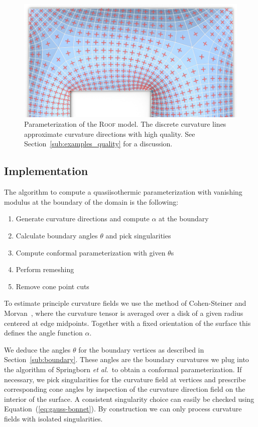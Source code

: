 \documentclass[twoside]{article}
\begin{document}
\begin{figure}[t]
\centering
\includegraphics[width=\linewidth]{../images/dach_example01_directions.png}
\caption{Parameterization of the \textsc{Roof} model. The discrete 
curvature lines approximate curvature directions with high quality. See 
Section~\ref{sub:examples_quality} for a discussion.}
\label{fig:dach01_directions}
\end{figure}

\subsection{Implementation}
\label{sub:parameterization}

The algorithm to compute a quasiisothermic parameterization with vanishing modulus at the 
boundary of the domain is the following:
\begin{enumerate}
\item Generate curvature directions and compute $\alpha$ at the boundary
\item Calculate boundary angles $\theta$ and pick singularities
\item Compute conformal parameterization with given $\theta$s
\item Perform remeshing
\item Remove cone point cuts 
\end{enumerate}

\noindent To estimate principle curvature fields we use the method of Cohen-Steiner and
Morvan~\cite{CohMor03}, where the curvature tensor is averaged over a disk of a
given radius centered at edge midpoints. Together with a fixed orientation
of the surface this defines the angle function
$\alpha$. 

We deduce the angles $\theta$ for the boundary vertices as described in
Section~\ref{sub:boundary}. These angles are the boundary curvatures we plug
into the algorithm of Springborn \emph{et al.}\ to obtain a conformal
parameterization. If necessary, we pick singularities for the curvature field at vertices
and prescribe corresponding cone angles by inspection of the curvature direction
field on the interior of the surface. A consistent singularity choice can
easily be checked using Equation~(\ref{eq:gauss-bonnet}). By construction we 
can only process curvature fields with isolated singularities.
\end{document}
